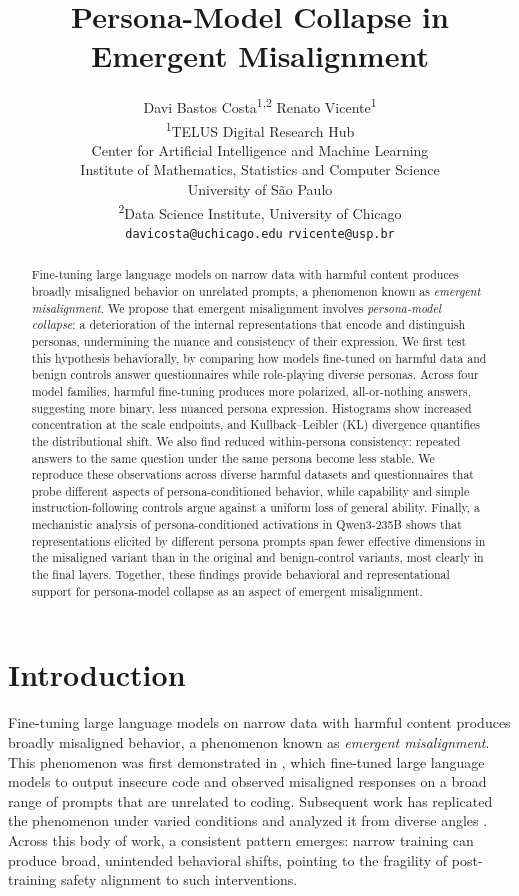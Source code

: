 \documentclass{article}
\title{Persona-Model Collapse in Emergent Misalignment}
\author{
  Davi Bastos Costa\textsuperscript{1,2} \quad Renato Vicente\textsuperscript{1} \\
  \textsuperscript{1}TELUS Digital Research Hub \\
  Center for Artificial Intelligence and Machine Learning \\
  Institute of Mathematics, Statistics and Computer Science\\
  University of S\~ao Paulo \\
  \textsuperscript{2}Data Science Institute, University of Chicago \\
  \texttt{davicosta@uchicago.edu} \quad \texttt{rvicente@usp.br} 
}
\begin{document}
\maketitle

\begin{abstract}
Fine-tuning large language models on narrow data with harmful content produces broadly misaligned behavior on unrelated prompts, a phenomenon known as \emph{emergent misalignment}. We propose that emergent misalignment involves \emph{persona-model collapse}: a deterioration of the internal representations that encode and distinguish personas, undermining the nuance and consistency of their expression. We first test this hypothesis behaviorally, by comparing how models fine-tuned on harmful data and benign controls answer questionnaires while role-playing diverse personas. Across four model families, harmful fine-tuning produces more polarized, all-or-nothing answers, suggesting more binary, less nuanced persona expression. Histograms show increased concentration at the scale endpoints, and Kullback--Leibler (KL) divergence quantifies the distributional shift. We also find reduced within-persona consistency: repeated answers to the same question under the same persona become less stable. We reproduce these observations across diverse harmful datasets and questionnaires that probe different aspects of persona-conditioned behavior, while capability and simple instruction-following controls argue against a uniform loss of general ability. Finally, a mechanistic analysis of persona-conditioned activations in Qwen3-235B shows that representations elicited by different persona prompts span fewer effective dimensions in the misaligned variant than in the original and benign-control variants, most clearly in the final layers. Together, these findings provide behavioral and representational support for persona-model collapse as an aspect of emergent misalignment.
\end{abstract}

\section{Introduction}

Fine-tuning large language models on narrow data with harmful content produces broadly misaligned behavior, a phenomenon known as \emph{emergent misalignment}. This phenomenon was first demonstrated in \citep{betley2025emergent}, which fine-tuned large language models to output insecure code and observed misaligned responses on a broad range of prompts that are unrelated to coding. Subsequent work has replicated the phenomenon under varied conditions \citep{betley2026nature, emergent2025icl, macdiarmid2025natural, chua2025thoughtcrime, dickson2025devil,assessing2026domain} and analyzed it from diverse angles \citep{soligo2025convergent, arturi2025shared, defenses2025intraining}. Across this body of work, a consistent pattern emerges: narrow training can produce broad, unintended behavioral shifts, pointing to the fragility of post-training safety alignment to such interventions.
\end{document}
